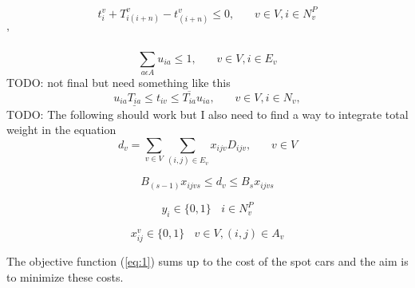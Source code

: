 \documentclass[a4paper,12pt]{article}
\begin{document}
\begin{equation} \label{eq:15}
    t_{i}^v + T_{i(i+n)}^v - t_{(i+n)}^v \leq 0, ~~~~~~~~ v \in V, i \in N^P_v
\end{equation}'

\begin{equation} \label{eq:16}
    \sum_{a\epsilon A} u_{ia} \leq 1, ~~~~~~~~ v \in V, i\in E_v
\end{equation}
TODO: not final but need something like this
\begin{equation} \label{eq:17}
    u_{ia}\underline{T_{ia}} \leq t_{iv} \leq  \overline{T_{ia}}u_{ia}, ~~~~~~~~ v \in V, i \in N_v,
\end{equation}
TODO: The following should work but I also need to find a way to integrate total weight in the equation
\begin{equation} \label{eq:18}
    d_v = \sum_{v \in V} \sum_{(i,j) \in E_v} x_{ijv}D_{ijv},~~~~~~~~ v \in V
\end{equation}

\begin{equation} \label{eq:19}
    B_{(s-1)}x_{ijvs} \leq d_v \leq B_sx_{ijvs}
\end{equation}

\begin{equation} \label{eq:20}
y_i \in \{0, 1\} ~~~~ i \in N_v^P
\end{equation}


\begin{equation} \label{eq:21}
x_{ij}^v \in \{0, 1\} ~~~~ v \in V, (i, j) \in A_v
\end{equation}




\par
The objective function (\ref{eq:1}) sums up to the cost of the spot cars and the aim is to minimize these costs. \newline \newline
\end{document}
